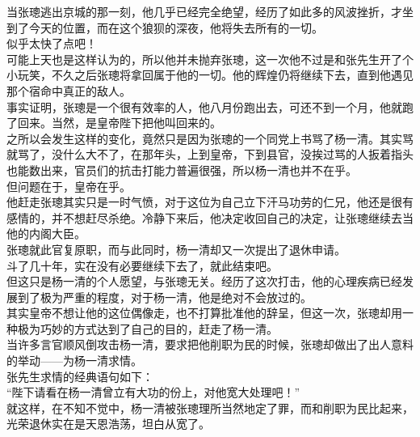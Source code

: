 \begin{multicols}{\theparacolNo}
当张璁逃出京城的那一刻，他几乎已经完全绝望，经历了如此多的风波挫折，才坐到了今天的位置，而在这个狼狈的深夜，他将失去所有的一切。\\

似乎太快了点吧！\\

可能上天也是这样认为的，所以他并未抛弃张璁，这一次他不过是和张先生开了个小玩笑，不久之后张璁将拿回属于他的一切。他的辉煌仍将继续下去，直到他遇见那个宿命中真正的敌人。\\

事实证明，张璁是一个很有效率的人，他八月份跑出去，可还不到一个月，他就跑了回来。当然，是皇帝陛下把他叫回来的。\\

之所以会发生这样的变化，竟然只是因为张璁的一个同党上书骂了杨一清。其实骂就骂了，没什么大不了，在那年头，上到皇帝，下到县官，没挨过骂的人扳着指头也能数出来，官员们的抗击打能力普遍很强，所以杨一清也并不在乎。\\

但问题在于，皇帝在乎。\\

他赶走张璁其实只是一时气愤，对于这位为自己立下汗马功劳的仁兄，他还是很有感情的，并不想赶尽杀绝。冷静下来后，他决定收回自己的决定，让张璁继续去当他的内阁大臣。\\

张璁就此官复原职，而与此同时，杨一清却又一次提出了退休申请。\\

斗了几十年，实在没有必要继续下去了，就此结束吧。\\

但这只是杨一清的个人愿望，与张璁无关。经历了这次打击，他的心理疾病已经发展到了极为严重的程度，对于杨一清，他是绝对不会放过的。\\

其实皇帝不想让他的这位偶像走，也不打算批准他的辞呈，但这一次，张璁却用一种极为巧妙的方式达到了自己的目的，赶走了杨一清。\\

当许多言官顺风倒攻击杨一清，要求把他削职为民的时候，张璁却做出了出人意料的举动——为杨一清求情。\\

张先生求情的经典语句如下：\\

“陛下请看在杨一清曾立有大功的份上，对他宽大处理吧！”\\

就这样，在不知不觉中，杨一清被张璁理所当然地定了罪，而和削职为民比起来，光荣退休实在是天恩浩荡，坦白从宽了。\\


\end{multicols}
